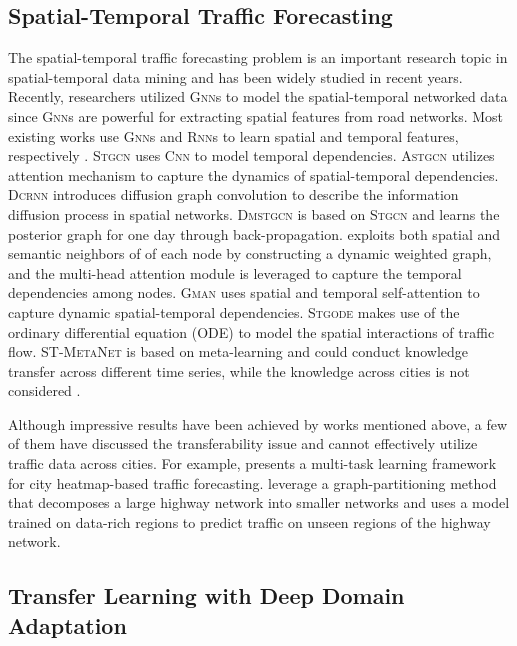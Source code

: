 \documentclass[sigconf]{acmart}
\theoremstyle{definition}
\begin{document}
\subsection{Spatial-Temporal Traffic Forecasting}

The spatial-temporal traffic forecasting problem is an important research topic in spatial-temporal data mining and has been widely studied in recent years. 
Recently, researchers utilized \textsc{Gnn}s \cite{kipf2016semi,velivckovic2017graph,zhang2020spatial,xie2020deep,park2020st} to model the  spatial-temporal networked data since \textsc{Gnn}s are powerful for extracting spatial features from road networks. Most existing works use \textsc{Gnn}s and \textsc{Rnn}s to learn spatial and temporal features, respectively \cite{zhao2019t}. \textsc{Stgcn} \cite{yu2017spatio} uses \textsc{Cnn} to model temporal dependencies. \textsc{Astgcn} \cite{guo2019attention} utilizes attention mechanism to capture the dynamics of spatial-temporal dependencies. \textsc{Dcrnn} \cite{li2017diffusion} introduces diffusion graph convolution to describe the information diffusion process in spatial networks. \textsc{Dmstgcn} \cite{han2021dynamic} is based on \textsc{Stgcn} and learns the posterior graph for one day through back-propagation. \cite{lu2020spatiotemporal} exploits both spatial and semantic neighbors of of each node by constructing a dynamic weighted graph, and  the multi-head attention module is leveraged to capture the temporal dependencies among nodes. \textsc{Gman} \cite{zheng2020gman} uses spatial and temporal self-attention to capture dynamic spatial-temporal dependencies.  \textsc{Stgode} \cite{fang2021spatial} makes use of the ordinary differential equation (ODE) to model the spatial interactions of traffic flow. \textsc{ST-MetaNet}  is based on meta-learning and could conduct knowledge transfer across different time series, while the knowledge across cities is not considered \cite{pan2020spatio}.

Although impressive results have been achieved by works mentioned above, a few of them have discussed the transferability issue and cannot effectively utilize traffic data across cities. For example, \cite{lu2021learning} presents a multi-task learning framework for city heatmap-based traffic forecasting. \cite{mallick2021transfer} leverage a graph-partitioning method that decomposes a large highway network into smaller networks and uses a model trained on data-rich regions to predict traffic on unseen regions of the highway network.

\subsection{Transfer Learning with Deep Domain Adaptation}
\end{document}
